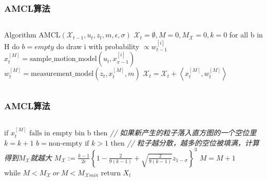 \begin{frame}
  \frametitle{AMCL算法}

  \begin{columns}
    \begin{block}
      
    \begin{algorithmic}[1]

      \State Algorithm AMCL$(\mathcal{X}_{t-1}, u_t, z_t, m, \epsilon, \sigma)$
      \State $\mathcal{X}_t = \emptyset, M = 0, M_{\mathcal{X}} = 0, k = 0$
      \State for all b in H do  
      \State \quad $b = empty$
      \State do
      \State \quad draw i with probability $\propto w_{t-1}^{[i]}$
      \State \quad $x_t^{[M]} = \text{sample\_motion\_model}(u_t, x_{x-1}^{[i]})$
      \State \quad $w_t^{[M]} = \text{measurement\_model}(z_t, x_t^{[M]}, m)$
      \State \quad $\mathcal{X}_t = \mathcal{X}_t + \left\langle x_t^{[M]}, w_t^{[M]} \right \rangle$
    \end{algorithmic}
    \end{block}

  \end{columns}
\end{frame}

\begin{frame}
  \frametitle{AMCL算法}

  \begin{columns}
    \begin{block}
      
    \begin{algorithmic}[1]

      \State \quad $\text{if } x_t^{[M]} \text{ falls in empty bin b then}$  \textit{
        \tiny // 如果新产生的粒子落入直方图的一个空位里} %
      \State \qquad $k = k+1$ 
      \State \qquad $b = \text{non-empty}$
      \State \qquad $\text{if } k > 1 \text{ then}$ \textit{\tiny  // 粒子越分散，越多的空位被填满，计算得到$M_{\mathcal{X}}$就越大}
      \State \qquad \quad $M_{\mathcal{X}} := \frac{k-1}{2\epsilon} \left\{1 - \frac{2}{9(k-1)} + \sqrt{\frac{2}{9(k-1)}}z_{1-\sigma} \right\} ^3$
      \State \qquad $M = M + 1$
      \State $\text{while } M < M_{\mathcal{X}} \ or \ M < M_{\mathcal{X}min}$
      \State return $X_t$
    \end{algorithmic}
    \end{block}

  \end{columns}
\end{frame}

